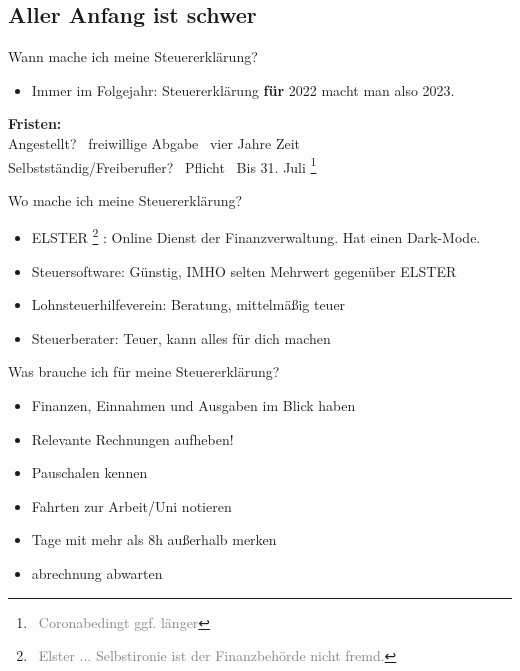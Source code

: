 \documentclass{beamer}
\let\oldfootnote\footnote
\renewcommand{\footnote}[1]
{%
	\oldfootnote
	{
		\tiny
		\textcolor{gray}{\ #1}
	}%
}
\begin{document}
		\subsection{Aller Anfang ist schwer}
		
			\begin{frame}{Wann mache ich meine Steuererklärung?}
				\begin{itemize}
					\item Immer im Folgejahr: Steuererklärung \textbf{für} 2022 macht man also 2023.
				\end{itemize}\n
				\textbf{Fristen:}\\
				Angestellt? \textrightarrow\ freiwillige Abgabe \textrightarrow\ vier Jahre Zeit\\
				Selbstständig/Freiberufler? \textrightarrow\ Pflicht \textrightarrow\ Bis 31. Juli\footnote{Coronabedingt ggf. länger}
			\end{frame}

			\begin{frame}{Wo mache ich meine Steuererklärung?}
				\begin{itemize}
					\item ELSTER\footnote{Elster ... Selbstironie ist der Finanzbehörde nicht fremd.}: Online Dienst der Finanzverwaltung. Hat einen Dark-Mode.
					\item Steuersoftware: Günstig, IMHO selten Mehrwert gegenüber ELSTER
					\item Lohnsteuerhilfeverein: Beratung, mittelmäßig teuer
					\item Steuerberater: Teuer, kann alles für dich machen
				\end{itemize}
			\end{frame}
		
			\begin{frame}{Was brauche ich für meine Steuererklärung?}
				\begin{itemize}
					\item Finanzen, Einnahmen und Ausgaben im Blick haben
					\item Relevante Rechnungen aufheben!
					\item Pauschalen kennen
					\item Fahrten zur Arbeit/Uni notieren
					\item Tage mit mehr als 8h außerhalb merken
					\item abrechnung abwarten
				\end{itemize}
			\end{frame}
		
\end{document}
